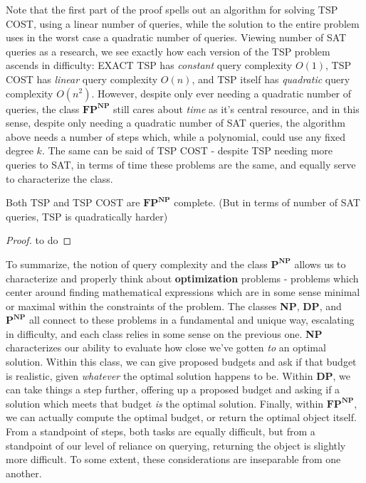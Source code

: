 Note that the first part of the proof spells out an algorithm for solving TSP COST, using a linear number of queries, while the solution to the entire problem uses in the worst case a quadratic number of queries. Viewing number of SAT queries as a research, we see exactly how each version of the TSP problem ascends in difficulty: EXACT TSP has \textit{constant} query complexity $O(1)$, TSP COST has \textit{linear} query complexity $O(n)$, and TSP itself has \textit{quadratic} query complexity $O(n^2)$. However, despite only ever needing a quadratic number of queries, the class $\textbf{FP}^{\textbf{NP}}$ still cares about \textit{time} as it's central resource, and in this sense, despite only needing a quadratic number of SAT queries, the algorithm above needs a number of steps which, while a polynomial, could use any fixed degree $k$. The same can be said of TSP COST - despite TSP needing more queries to SAT, in terms of time these problems are the same, and equally serve to characterize the class.
\begin{theorem}
    Both TSP and TSP COST are $\textbf{FP}^{\textbf{NP}}$ complete. (But in terms of number of SAT queries, TSP is quadratically harder)
\end{theorem}
\begin{proof}
    to do
\end{proof}
To summarize, the notion of query complexity and the class $\textbf{P}^{\textbf{NP}}$ allows us to characterize and properly think about \textbf{optimization} problems - problems which center around finding mathematical expressions which are in some sense minimal or maximal within the constraints of the problem. The classes \textbf{NP}, \textbf{DP}, and $\textbf{P}^{\textbf{NP}}$ all connect to these problems in a fundamental and unique way, escalating in difficulty, and each class relies in some sense on the previous one. \textbf{NP} characterizes our ability to evaluate how close we've gotten \textit{to} an optimal solution. Within this class, we can give proposed budgets and ask if that budget is realistic, given \textit{whatever} the optimal solution happens to be. Within \textbf{DP}, we can take things a step further, offering up a proposed budget and asking if a solution which meets that budget \textit{is} the optimal solution. Finally, within $\textbf{FP}^{\textbf{NP}}$, we can actually compute the optimal budget, or return the optimal object itself. From a standpoint of steps, both tasks are equally difficult, but from a standpoint of our level of reliance on querying, returning the object is slightly more difficult. To some extent, these considerations are inseparable from one another.
